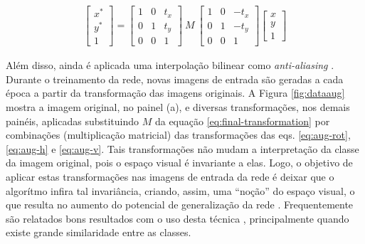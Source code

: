\begin{align} \label{eq:final-transformation}
  \begin{bmatrix}
    x^* \\
    y^* \\
    1
  \end{bmatrix}
  =
  \begin{bmatrix}
    1 & 0 & t_x \\
    0 & 1 & t_y \\
    0 & 0 & 1
  \end{bmatrix}
  \ M\
  \begin{bmatrix}
    1 & 0 & -t_x \\
    0 & 1 & -t_y \\
    0 & 0 & 1
  \end{bmatrix}
  \begin{bmatrix}
    x \\
    y \\
    1
  \end{bmatrix}
\end{align}

Além disso, ainda é aplicada uma interpolação bilinear como \emph{anti-aliasing} \citep{aliasing,bilinear}. Durante o treinamento da rede, novas imagens de entrada são geradas a cada época a partir da transformação das imagens originais. A Figura \ref{fig:dataaug} mostra a imagem original, no painel (a), e diversas transformações, nos demais painéis, aplicadas substituindo $M$ da equação \eqref{eq:final-transformation} por combinações (multiplicação matricial) das transformações das eqs. \eqref{eq:aug-rot}, \eqref{eq:aug-h} e \eqref{eq:aug-v}. Tais transformações não mudam a interpretação da classe da imagem original, pois o espaço visual é invariante a elas. Logo, o objetivo de aplicar estas transformações nas imagens de entrada da rede é deixar que o algorítmo infira tal invariância, criando, assim, uma ``noção'' do espaço visual, o que resulta no aumento do potencial de generalização da rede \citep{Simard2003,CholletBook}. Frequentemente são relatados bons resultados com o uso desta técnica \citep{EfficientNetEx01,EfficientNetEx02,CNNEx04}, principalmente quando existe grande similaridade entre as classes.







